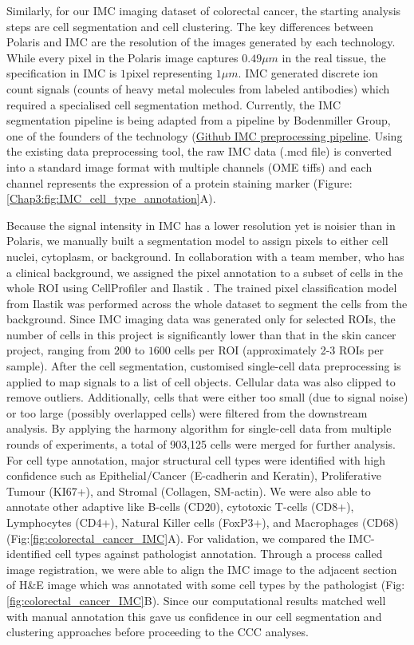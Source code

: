 Similarly, for our IMC imaging dataset of colorectal cancer, the starting analysis steps are cell segmentation and cell clustering. The key differences between Polaris and IMC are the resolution of the images generated by each technology. While every pixel in the Polaris image captures $0.49 \mu m$ in the real tissue, the specification in IMC is $1$pixel representing $1\mu m$. IMC generated discrete ion count signals (counts of heavy metal molecules from labeled antibodies) which required a specialised cell segmentation method. Currently, the IMC segmentation pipeline is being adapted from a pipeline by Bodenmiller Group, one of the founders of the technology (\href{https://github.com/BodenmillerGroup/ImcSegmentationPipeline/blob/development/scripts/imc_preprocessing.ipynb}{Github IMC preprocessing pipeline}. Using the existing data preprocessing tool, the raw IMC data (.mcd file) is converted into a standard image format with multiple channels (OME tiffs) and each channel represents the expression of a protein staining marker (Figure: \ref{Chap3:fig:IMC_cell_type_annotation}A). 

Because the signal intensity in IMC has a lower resolution yet is noisier than in Polaris, we manually built a segmentation model to assign pixels to either cell nuclei, cytoplasm, or background. In collaboration with a team member, who has a clinical background, we assigned  the pixel annotation to a subset of cells in the whole ROI using CellProfiler and Ilastik \cite{carpenter2006cellprofiler, berg2019ilastik}. The trained pixel classification model from Ilastik was performed across the whole dataset to segment the cells from the background. Since IMC imaging data was generated only for selected ROIs, the number of cells in this project is significantly lower than that in the skin cancer project, ranging from $200$ to $1600$ cells per ROI (approximately 2-3 ROIs per sample). After the cell segmentation, customised single-cell data preprocessing is applied to map signals to a list of cell objects. Cellular data was also clipped to remove outliers. Additionally, cells that were either too small (due to  signal noise) or too large (possibly overlapped cells) were filtered from the downstream analysis. By applying the harmony algorithm for single-cell data from multiple rounds of experiments, a total of 903,125 cells were merged for further analysis. For cell type annotation, major structural cell types were identified with high confidence such as Epithelial/Cancer (E-cadherin and Keratin), Proliferative Tumour (KI67+), and Stromal (Collagen, SM-actin). We were also able to annotate other adaptive like B-cells (CD20), cytotoxic T-cells (CD8+), Lymphocytes (CD4+), Natural Killer cells (FoxP3+), and Macrophages (CD68) (Fig:\ref{fig:colorectal_cancer_IMC}A). For validation, we compared the IMC-identified cell types against pathologist annotation. Through a process called image registration, we were able to align the IMC image to the adjacent section of H\&E image which was annotated with some cell types by the pathologist (Fig:\ref{fig:colorectal_cancer_IMC}B). Since our computational results matched well with manual annotation this gave us confidence in our cell segmentation and clustering approaches before proceeding to the CCC analyses. 

